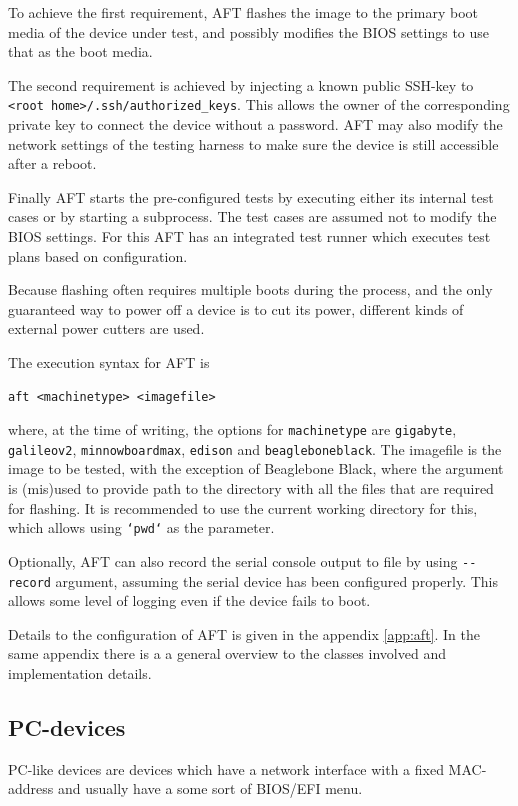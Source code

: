 \documentclass[a4paper,11pt]{article}
\newcommand{\cmd}[1]{\texttt{#1}}
\begin{document}
To achieve the first requirement, AFT flashes the image to the primary boot media of the device under test, and possibly modifies the BIOS settings to use that as the boot media.

The second requirement is achieved by injecting a known public SSH-key to \linebreak\cmd{<root home>/.ssh/authorized\_keys}. This allows the owner of the corresponding private key to connect the device without a password. AFT may also modify the network settings of the testing harness to make sure the device is still accessible after a reboot.

Finally AFT starts the pre-configured tests by executing either its internal test cases or by starting a subprocess. The test cases are assumed not to modify the BIOS settings. For this AFT has an integrated test runner which executes test plans based on configuration.

Because flashing often requires multiple boots during the process, and the only guaranteed way to power off a device is to cut its power, different kinds of external power cutters are used.

The execution syntax for AFT is
\begin{lstlisting}
aft <machinetype> <imagefile>
\end{lstlisting}
where, at the time of writing, the options for  \cmd{machinetype} are \cmd{gigabyte}, \cmd{galileov2}, \cmd{minnowboardmax}, \cmd{edison} and \cmd{beagleboneblack}. The imagefile is the image to be tested, with the exception of Beaglebone Black, where the argument is (mis)used to provide path to the directory with all the files that are required for flashing. It is recommended to use the current working directory for this, which allows using \cmd{`pwd`} as the parameter.

Optionally, AFT can also record the serial console output to file by using \cmd{-\/-record} argument, assuming the serial device has been configured properly. This allows some level of logging even if the device fails to boot.

Details to the configuration of AFT is given in the appendix \ref{app:aft}. In the same appendix there is a a general overview to the classes involved and implementation details.

\subsection{PC-devices}
\label{pc}
PC-like devices are devices which have a network interface with a fixed MAC-address and usually have a some sort of BIOS/EFI menu.
\end{document}
